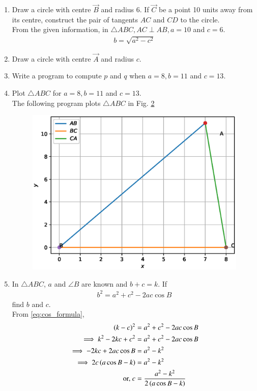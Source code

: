 \documentclass[journal,12pt,twocolumn]{IEEEtran}
\renewcommand\thesection{\arabic{section}}
\begin{document}
\begin{enumerate}[label=\thesection.\arabic*
,ref=\thesection.\theenumi]
\begin{figure}
\caption{}
\label{fig:circle}
\end{figure}
\end{enumerate}
%
\begin{enumerate}[label=\thesection.\arabic*
,ref=\thesection.\theenumi]
\item Draw a circle with centre $\vec{B}$ and radius 6.  If $\vec{C}$ be  a point 10 units  away from its 
centre, construct the pair of tangents $AC$ and $CD$ to the 
circle.
\\
\solution From the given information, in $\triangle ABC, AC \perp AB, a = 
10$ and $c = 6$.
\begin{align}
b =  \sqrt{a^2-c^2}
\end{align}
\item Draw a circle with centre $\vec{A}$ and radius $c$.
\item Write a program to compute $p$ and $q$ when $a = 8, b = 11$ and $c = 13$. 
\item Plot $\triangle ABC$ for $a = 8, b = 11$ and $c = 13$. 
\\
\solution The following program plots $\triangle ABC$ in Fig. \ref{fig:triangle}

%
\begin{figure}
\centering
\includegraphics[width=\columnwidth]{./figs/triangle.eps}
\caption{}
\label{fig:triangle}
\end{figure}
\item In $\triangle ABC$,  $a$ and  $\angle B$ are known and $b+c = k$. If 
\begin{align}
\label{eq:cos_formula}
b^2  = a^2+c^2- 2ac \cos B
\end{align}
%
find $b$ and $c$.
\\
\solution From \eqref{eq:cos_formula}, 
\begin{align}
\label{eq:aB}
\left(k-c\right)^2 &= a^2+c^2- 2ac \cos B
\\
\implies k^2 -2kc+c^2 &= a^2+c^2- 2ac \cos B
\\
\implies -2kc+ 2ac \cos B&= a^2-k^2 
\\
\implies 2c\left(a \cos B -k\right)&= a^2-k^2 
\\
\text{or, } c &= \frac{ a^2-k^2 }{2\left(a \cos B -k\right)}
\end{align}


\end{enumerate}
\end{document}
